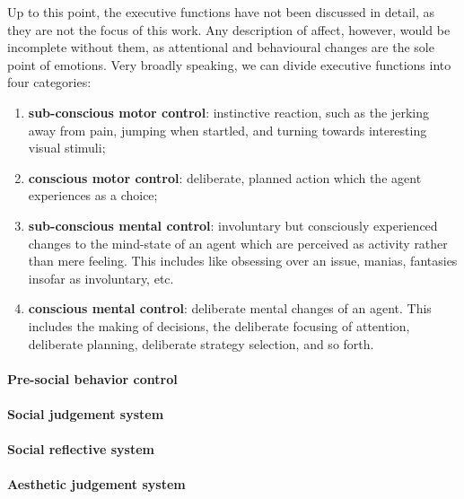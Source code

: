\documentclass[]{scrartcl}
\theoremstyle{break}
\begin{document}
Up to this point, the executive functions have not been discussed in detail, as they are not the focus of this work. Any description of affect, however, would be incomplete without them, as attentional and behavioural changes are the sole point of emotions. Very broadly speaking, we can divide executive functions into four categories:

\begin{enumerate}
	\item \textbf{sub-conscious motor control}: instinctive reaction, such as the jerking away from pain, jumping when startled, and turning towards interesting visual stimuli;
	\item \textbf{conscious motor control}: deliberate, planned action which the agent experiences as a choice;
	\item \textbf{sub-conscious mental control}: involuntary but consciously experienced changes to the mind-state of an agent which are perceived as activity rather than mere feeling. This includes like obsessing over an issue, manias, fantasies insofar as involuntary, etc.
	\item \textbf{conscious mental control}: deliberate mental changes of an agent. This includes the making of decisions, the deliberate focusing of attention, deliberate planning, deliberate strategy selection, and so forth.
\end{enumerate}

\paragraph{Pre-social behavior control}

\paragraph{Social judgement system}

\paragraph{Social reflective system}

\paragraph{Aesthetic judgement system}

\pagebreak

\nocite{*}




\end{document}
